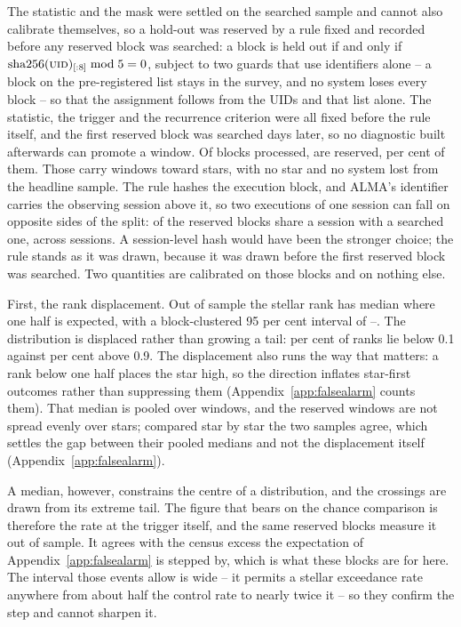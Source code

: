 The statistic and the mask were settled on the searched sample and cannot also
calibrate themselves, so a hold-out was reserved by a rule fixed and recorded
before any reserved block was searched: a block is held out if and only if
$\mathrm{sha256}(\textsc{uid})_{[:8]} \bmod 5 = 0$, subject to two guards that
use identifiers alone -- a block on the pre-registered list stays in the
survey, and no system loses every block -- so that the assignment follows
from the UIDs and that list alone. The statistic, the trigger and the
recurrence criterion were all fixed before the rule itself, and the first
reserved block was searched \HoLeadBlockDays{} days later, so no diagnostic
built afterwards can promote a window. Of
\NEbProcessedAll{} blocks processed, \NEbHeldOut{} are reserved, \HoPctHeld{}
per cent of them. Those carry \HoWin{} windows toward \HoStars{} stars, with
no star and no system lost from the headline sample. The rule hashes the
execution block, and ALMA's
identifier carries the observing session above it, so two executions of one
session can fall on opposite sides of the split: \BkSessHoBlocks{} of the
\NEbHeldOut{} reserved blocks share a session with a searched one, across
\BkSessShared{} sessions. A session-level hash would have been the stronger
choice; the rule stands as it was drawn, because it was drawn before the
first reserved block was searched. Two quantities are calibrated on those
blocks and on nothing else.

First, the rank displacement. Out of sample the stellar rank has median
\HoRankMed{} where one half is expected, with a block-clustered 95 per cent
interval of \HoRankMedLo--\HoRankMedHi. The distribution is displaced rather
than growing a tail: \HOFracLoPct{} per cent of ranks lie below 0.1 against
\HOFracHiPct{} per cent above 0.9. The displacement also runs the way that
matters: a rank below one half places the star high, so the direction
inflates star-first outcomes rather than suppressing them
(Appendix~\ref{app:falsealarm} counts them).
That median is pooled over windows, and the reserved windows are not spread
evenly over stars; compared star by star the two samples agree, which settles
the gap between their pooled medians and not the displacement itself
(Appendix~\ref{app:falsealarm}).

A median, however, constrains the centre of a distribution, and the
crossings are drawn from its extreme tail. The figure that bears on the
chance comparison is therefore the rate at the trigger itself, and the same
reserved blocks measure it out of sample. It agrees with the census excess the
expectation of Appendix~\ref{app:falsealarm} is stepped by, which is what
these blocks are for here. The interval those \StHoObs{} events allow is wide
-- it permits a stellar exceedance rate anywhere from about half the control
rate to nearly twice it -- so they confirm the step and cannot sharpen it.

